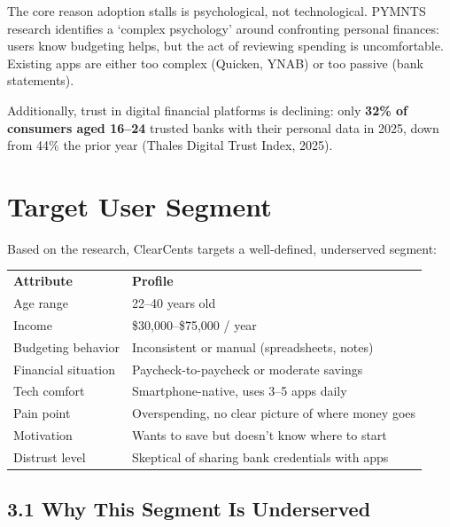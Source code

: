 \documentclass[11pt,a4paper]{article}
\begin{document}
The core reason adoption stalls is psychological, not technological. PYMNTS research
identifies a `complex psychology' around confronting personal finances: users know budgeting
helps, but the act of reviewing spending is uncomfortable. Existing apps are either too
complex (Quicken, YNAB) or too passive (bank statements).

Additionally, trust in digital financial platforms is declining: only \textbf{32\% of
consumers aged 16--24} trusted banks with their personal data in 2025, down from 44\% the
prior year (Thales Digital Trust Index, 2025).

\newpage

\section{Target User Segment}

Based on the research, ClearCents targets a well-defined, underserved segment:

\vspace{0.5em}
\begin{tabularx}{\textwidth}{L{4.5cm} L{10.5cm}}
\color{white}\textbf{Attribute} & \color{white}\textbf{Profile} \\
Age range & 22--40 years old \\
Income & \$30,000--\$75,000 / year \\
Budgeting behavior & Inconsistent or manual (spreadsheets, notes) \\
Financial situation & Paycheck-to-paycheck or moderate savings \\
Tech comfort & Smartphone-native, uses 3--5 apps daily \\
Pain point & Overspending, no clear picture of where money goes \\
Motivation & Wants to save but doesn't know where to start \\
Distrust level & Skeptical of sharing bank credentials with apps \\
\end{tabularx}
\vspace{0.5em}

\subsection{3.1 Why This Segment Is Underserved}
\end{document}
